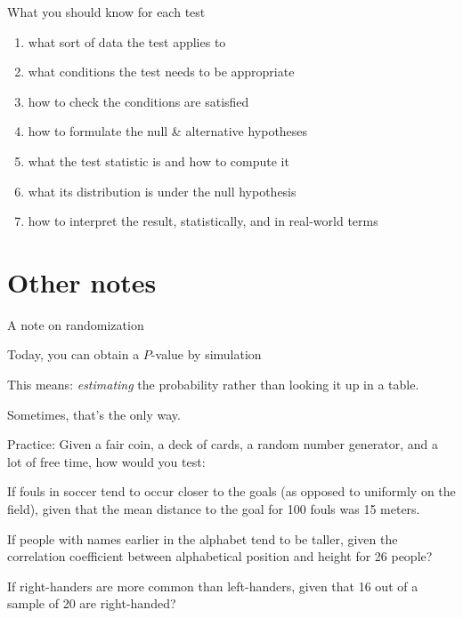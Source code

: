 \begin{frame}{What you should know for each test}

  \begin{enumerate}
    \item what sort of data the test applies to
    \item what conditions the test needs to be appropriate
    \item how to check the conditions are satisfied
    \item how to formulate the null \& alternative hypotheses
    \item what the test statistic is and how to compute it
    \item what its distribution is under the null hypothesis
    \item how to interpret the result, statistically, and in real-world terms
  \end{enumerate}

\end{frame}

\section{Other notes}

\begin{frame}{A note on randomization}

    Today, you can  obtain a $P$-value by \alert{simulation}
    \vspace{2em}

    This means: \emph{estimating} the probability rather than looking it up in a table.
    \vspace{2em}
    
    Sometimes, that's the \alert{only way}.

\end{frame}


\begin{frame}{Practice:}
    Given a \alert{fair coin}, a \alert{deck of cards}, a \alert{random number generator}, and a lot of free time, how would you test:
    \vfill

    If fouls in soccer tend to occur closer to the goals (as opposed to uniformly on the field),
    given that the mean distance to the goal for 100 fouls was 15 meters.
    \vfill

    If people with names earlier in the alphabet tend to be taller, given the correlation coefficient between alphabetical position and height for 26 people?
    \vfill

    If right-handers are more common than left-handers, given that 16 out of a sample of 20 are right-handed?
    \vfill

\end{frame}

